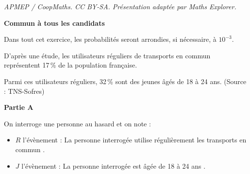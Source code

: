 \documentclass[10pt]{article}
\begin{document}
\noindent\textit{APMEP / CoopMaths. CC BY-SA. Présentation adaptée par Maths Explorer.}\par\medskip
\textbf{Commun à tous les candidats}

\medskip

Dans tout cet exercice, les probabilités seront arrondies, si nécessaire, à $10^{-3}$.

D'après une étude, les utilisateurs réguliers de transports en commun représentent 17\,\% de la population française. 

Parmi ces utilisateurs réguliers, 32\,\% sont des jeunes âgés de 18 à 24 ans. (Source : TNS-Sofres)

\bigskip

\textbf{Partie A}

\medskip
 
On interroge une personne au hasard et on note :

\setlength\parindent{9mm}
\begin{itemize}
\item $R$ l'évènement : \og La personne interrogée utilise régulièrement les transports en commun \fg.
\item $J$ l'évènement : \og La personne interrogée est âgée de 18 à 24 ans \fg.
\end{itemize}
\setlength\parindent{0mm}
\end{document}

